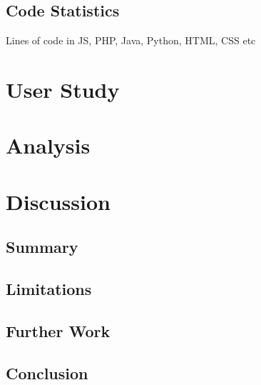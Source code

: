 \documentclass[12pt,a4paper,twoside, titlepage, openright, cleardoublepage=empty]{article}
\begin{document}
\subsection{Code Statistics}
Lines of code in JS, PHP, Java, Python, HTML, CSS etc

\cleardoublepage

\section{User Study}

\cleardoublepage

\section{Analysis}

\cleardoublepage

\section{Discussion}
\subsection{Summary}
\subsection{Limitations}
\subsection{Further Work}
\subsection{Conclusion}
\end{document}
